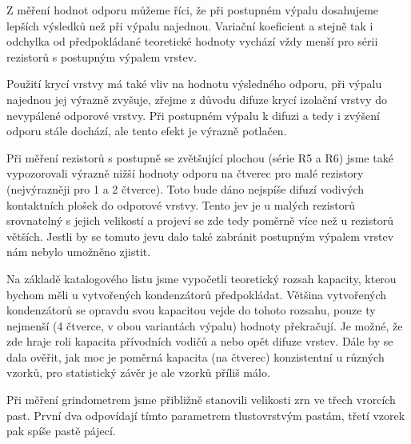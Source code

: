 Z měření hodnot odporu můžeme říci, že při postupném výpalu dosahujeme lepších výsledků než při výpalu najednou. Variační koeficient a stejně tak i odchylka od předpokládané teoretické hodnoty vychází vždy menší pro sérii rezistorů s postupným výpalem vrstev. 

Použití krycí vrstvy má také vliv na hodnotu výsledného odporu, při výpalu najednou jej výrazně zvyšuje, zřejme z důvodu difuze krycí izolační vrstvy do nevypálené odporové vrstvy. Při postupném výpalu k difuzi a tedy i zvýšení odporu stále dochází, ale tento efekt je výrazně potlačen.

Při měření rezistorů s postupně se zvětšující plochou (série R5 a R6) jsme také vypozorovali výrazně nižší hodnoty odporu na čtverec pro malé rezistory (nejvýrazněji pro 1 a 2 čtverce). Toto bude dáno nejspíše difuzí vodivých kontaktních plošek do odporové vrstvy. Tento jev je u malých rezistorů srovnatelný s jejich velikostí a projeví se zde tedy poměrně více než u rezistorů větších. Jestli by se tomuto jevu dalo také zabránit postupným výpalem vrstev nám nebylo umožněno zjistit. 


Na základě katalogového listu jsme vypočetli teoretický rozsah kapacity, kterou bychom měli u vytvořených kondenzátorů předpokládat. Většina vytvořených kondenzátorů se opravdu svou kapacitou vejde do tohoto rozsahu, pouze ty nejmenší (4 čtverce, v obou variantách výpalu) hodnoty překračují. Je možné, že zde hraje roli kapacita přívodních vodičů a nebo opět difuze vrstev. Dále by se dala ověřit, jak moc je poměrná kapacita (na čtverec) konzistentní u různých vzorků, pro statistický závěr je ale vzorků příliš málo. 

Při měření grindometrem jsme přibližně stanovili velikosti zrn ve třech vrorcích past. První dva odpovídají tímto parametrem tlustovrstvým pastám, třetí vzorek pak spíše pastě pájecí.